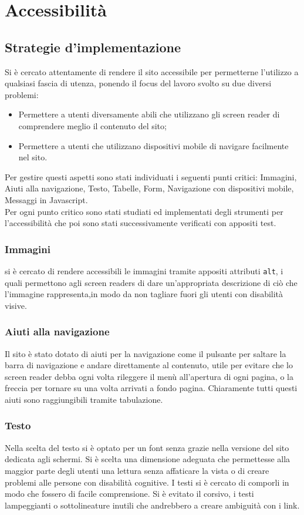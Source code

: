 \section{Accessibilità}
    \subsection{Strategie d'implementazione}
    Si è cercato attentamente di rendere il sito accessibile per permetterne l'utilizzo a qualsiasi fascia di utenza, ponendo il focus del lavoro svolto su due diversi problemi:
    \begin{itemize}
        \item Permettere a utenti diversamente abili che utilizzano gli screen reader di comprendere meglio il contenuto del sito;
        \item Permettere a utenti che utilizzano dispositivi mobile di navigare facilmente nel sito.
    \end{itemize}
    Per gestire questi aspetti sono stati individuati i seguenti punti critici: Immagini, Aiuti alla navigazione, Testo, Tabelle, Form, Navigazione con dispositivi mobile, Messaggi in Javascript.\\
    Per ogni punto critico sono stati studiati ed implementati degli strumenti per l'accessibilità che poi sono stati successivamente verificati con appositi test.
    \subsubsection{Immagini}
    si è cercato di rendere accessibili le immagini tramite appositi attributi \texttt{alt}, i quali permettono agli screen readers di dare un'appropriata descrizione di ciò che l'immagine rappresenta,in modo da non tagliare fuori gli utenti con disabilità visive.
    \subsubsection{Aiuti alla navigazione}
    Il sito è stato dotato di aiuti per la navigazione come il pulsante per saltare la barra di navigazione e andare direttamente al contenuto, utile per evitare che lo screen reader debba ogni volta rileggere il menù all’apertura di ogni pagina, o la freccia per tornare su una volta arrivati a fondo pagina. Chiaramente tutti questi aiuti sono raggiungibili tramite tabulazione.
    \subsubsection{Testo}
    Nella scelta del testo si è optato per un font senza grazie nella versione del sito dedicata agli schermi. Si è scelta una dimensione adeguata che permettesse alla maggior parte degli utenti una lettura senza affaticare la vista o di creare problemi alle persone con disabilità cognitive. I testi si è cercato di comporli in modo che fossero di facile comprensione. Si è evitato il corsivo, i testi lampeggianti o sottolineature inutili che andrebbero a creare ambiguità con i link.
